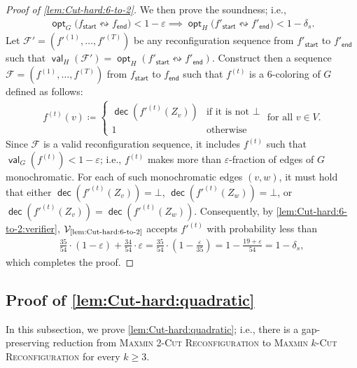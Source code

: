 \documentclass[11pt,fleqn]{article}
\renewcommand{\geq}{\geqslant}
\renewcommand{\epsilon}{\varepsilon}
\newcommand{\prb}[1]{\textsc{#1}\xspace}
\newcommand{\reco}{\leftrightsquigarrow}
\newcommand{\defeq}{\coloneq}
\DeclareMathOperator{\val}{\mathsf{val}}
\DeclareMathOperator{\opt}{\mathsf{opt}}
\DeclareMathOperator{\dec}{\mathsf{dec}}
\newcommand{\sss}{\mathsf{start}}
\newcommand{\ttt}{\mathsf{end}}
\newcommand{\V}{\calV}
\newcommand{\f}{f}
\newcommand{\sqcol}{\scrF}
\newcommand{\Vsix}{\V_{\text{\ref{lem:Cut-hard:6-to-2}}}}
\newcommand{\MMkCutReconf}{\prb{Maxmin $k$-Cut Reconfiguration}}
\newcommand{\MMtwoCutReconf}{\prb{Maxmin 2-Cut Reconfiguration}}
\newcommand{\calV}{\mathcal{V}}
\newcommand{\scrF}{\mathscr{F}}
\theoremstyle{definition}
\numberwithin{equation}{section}
\begin{document}
\begin{proof}[Proof of \cref{lem:Cut-hard:6-to-2}]
We then prove the soundness; i.e.,
\begin{align}
    \opt_G\bigl(\f_\sss \reco \f_\ttt\bigr) < 1-\epsilon
    \implies
    \opt_H\bigl(\f'_\sss \reco \f'_\ttt\bigr) < 1-\delta_s.
\end{align}
Let $\sqcol' = (\f'^{(1)}, \ldots, \f'^{(T)})$ be any reconfiguration sequence 
from $\f'_\sss$ to $\f'_\ttt$ such that
$\val_H(\sqcol') = \opt_H(\f'_\sss \reco \f'_\ttt)$.
Construct then a sequence $\sqcol = (\f^{(1)}, \ldots, \f^{(T)})$ from $\f_\sss$ to $\f_\ttt$
such that $\f^{(t)}$ is a $6$-coloring of $G$ defined as follows:
\begin{align}
    \f^{(t)}(v) \defeq
    \begin{cases}
        \dec(\f'^{(t)}(Z_v)) & \text{if it is not } \bot \\
        1 & \text{otherwise}
    \end{cases}
    \text{ for all } v \in V.
\end{align}
Since $\sqcol$ is a valid reconfiguration sequence,
it includes $\f^{(t)}$ such that
$\val_G(\f^{(t)}) < 1-\epsilon$; i.e.,
$\f^{(t)}$ makes more than $\epsilon$-fraction of edges of $G$ monochromatic.
For each of such monochromatic edges $(v,w)$,
it must hold that
either
$\dec(\f'^{(t)}(Z_v)) = \bot$,
$\dec(\f'^{(t)}(Z_w)) = \bot$, or
$\dec(\f'^{(t)}(Z_v)) = \dec(\f'^{(t)}(Z_w))$.
Consequently,
by \cref{lem:Cut-hard:6-to-2:verifier},
$\Vsix$ accepts $\f'^{(t)}$ with probability less than
\begin{align}
    \frac{35}{54}\cdot(1-\epsilon) + \frac{34}{54}\cdot \epsilon
    = \frac{35}{54} \cdot \left(1-\frac{\epsilon}{35}\right)
    = 1-\frac{19+\epsilon}{54}
    = 1-\delta_s,
\end{align}
which completes the proof.
\end{proof}











\subsection{Proof of \texorpdfstring{\cref{lem:Cut-hard:quadratic}}{Lemma~\protect\ref{lem:Cut-hard:quadratic}}}
\label{app:Cut-hard:quadratic}

In this subsection, we prove \cref{lem:Cut-hard:quadratic}; i.e.,
there is a gap-preserving reduction from
\MMtwoCutReconf to \MMkCutReconf for every $k \geq 3$.
\end{document}
